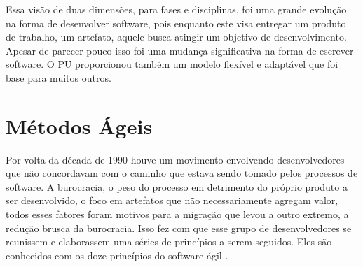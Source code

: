 \documentclass[
	article,			%
	11pt,				%
	oneside,			%
	a4paper,			%
	english,			%
	brazil,				%
	sumario=tradicional
	]{abntex2}
\begin{document}
Essa visão de duas dimensões, para fases e disciplinas, foi uma grande evolução
na forma de desenvolver software, pois enquanto este visa entregar um produto de
trabalho, um artefato, aquele busca atingir um objetivo de desenvolvimento.
Apesar de parecer pouco isso foi uma mudança significativa na forma de escrever
software. O PU proporcionou também um modelo flexível e adaptável que foi base
para muitos outros.

\section{Métodos Ágeis}

Por volta da década de 1990 houve um movimento envolvendo desenvolvedores que
não concordavam com o caminho que estava sendo tomado pelos processos de
software. A burocracia, o peso do processo em detrimento do próprio produto a
ser desenvolvido, o foco em artefatos que não necessariamente agregam valor,
todos esses fatores foram motivos para a migração que levou a outro extremo, a
redução brusca da burocracia. Isso fez com que esse grupo de desenvolvedores
se reunissem e elaborassem uma séries de princípios a serem seguidos. Eles são
conhecidos com os doze princípios do software ágil \cite{agilemanifesto}.
\end{document}
